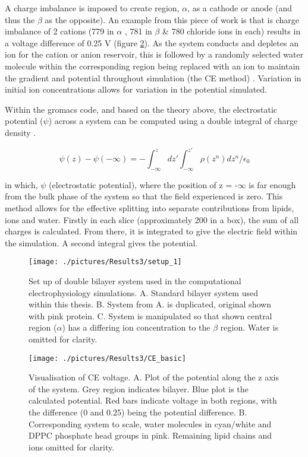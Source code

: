 A charge imbalance is imposed to create region, $\alpha$, as a cathode or anode (and thus the $\beta$ as the opposite). An example from this piece of work is that is charge imbalance of 2 cations (779 in $\alpha$ , 781 in $\beta$  \& 780 chloride ions in each) results in a voltage difference of 0.25 V (figure \ref{fig:CE_basic}). As the system conducts and depletes an ion for the cation or anion reservoir, this is followed by a randomly selected water molecule within the corresponding region being replaced with an ion to maintain the gradient and potential throughout simulation (the CE method) \cite{Kutzner2011}. Variation in initial ion concentrations allows for variation in the potential simulated. 

Within the gromacs code, and based on the theory above, the electrostatic potential ($\psi$) across a system can be computed using a double integral of charge density \cite{Apol2013}. 

\begin{equation}
\psi(z) - \psi(-\infty) = -\int_{-\infty}^{z}dz'\int_{-\infty}^{z'}\rho(z^n)dz^n/\epsilon_0
\end{equation}

in which, $\psi$ (electrostatic potential), where the position of z = -$\infty$ is far enough from the bulk phase of the system so that the field experienced is zero. This method allows for the effective splitting into separate contributions from lipids, ions and water. Firstly in each slice (approximately 200 in a box), the sum of all charges is calculated. From there, it is integrated to give the electric field within the simulation. A second integral gives the potential. 

\begin{figure}[H]
\begin{center}
\texttt{[image: ./pictures/Results3/setup\_1]}
\caption[Set up of double bilayer system used in the computational electrophysiology simulations.] {Set up of double bilayer system used in the computational electrophysiology simulations. A. Standard bilayer system used within this thesis. B. System from A. is duplicated, original shown with pink protein. C. System is manipulated so that shown central region ($\alpha$) has a differing ion concentration to the $\beta$ region. Water is omitted for clarity.}
\label{fig:setup_1}
\end{center}
\end{figure}

\begin{figure}[H]
\begin{center}
\texttt{[image: ./pictures/Results3/CE\_basic]}
\caption[Visualisation of CE voltage.] {Visualisation of CE voltage. A. Plot of the potential along the z axis of the system. Grey region indicates bilayer. Blue plot is the calculated potential. Red bars indicate voltage in both regions, with the difference (0 and 0.25) being the potential difference. B. Corresponding system to scale, water molecules in cyan/white and DPPC phosphate head groups in pink. Remaining lipid chains and ions omitted for clarity.}
\label{fig:CE_basic}
\end{center}
\end{figure}

